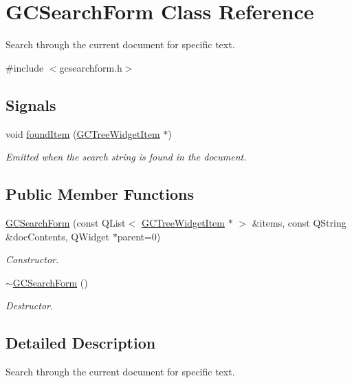 \hypertarget{class_g_c_search_form}{\section{\-G\-C\-Search\-Form \-Class \-Reference}
\label{class_g_c_search_form}
}


\-Search through the current document for specific text.  




{\ttfamily \#include $<$gcsearchform.\-h$>$}

\subsection*{\-Signals}
\begin{DoxyCompactItemize}
\item 
void \hyperlink{class_g_c_search_form_a275c8071b3e054236f90d979da26d084}{found\-Item} (\hyperlink{class_g_c_tree_widget_item}{\-G\-C\-Tree\-Widget\-Item} $\ast$)
\begin{DoxyCompactList}\small\item\em \-Emitted when the search string is found in the document. \end{DoxyCompactList}\end{DoxyCompactItemize}
\subsection*{\-Public \-Member \-Functions}
\begin{DoxyCompactItemize}
\item 
\hyperlink{class_g_c_search_form_a3e8731704cbe2cc86957af8aa6d7c17a}{\-G\-C\-Search\-Form} (const \-Q\-List$<$ \hyperlink{class_g_c_tree_widget_item}{\-G\-C\-Tree\-Widget\-Item} $\ast$ $>$ \&items, const \-Q\-String \&doc\-Contents, \-Q\-Widget $\ast$parent=0)
\begin{DoxyCompactList}\small\item\em \-Constructor. \end{DoxyCompactList}\item 
\hyperlink{class_g_c_search_form_a27023a33b05baafe5d41cfb738985688}{$\sim$\-G\-C\-Search\-Form} ()
\begin{DoxyCompactList}\small\item\em \-Destructor. \end{DoxyCompactList}\end{DoxyCompactItemize}


\subsection{\-Detailed \-Description}
\-Search through the current document for specific text. 

